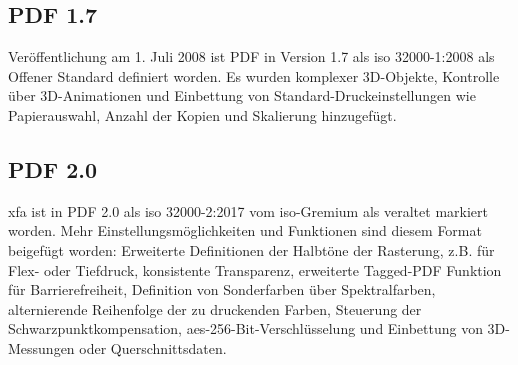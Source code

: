 \subsection{PDF 1.7}
Veröffentlichung am 1. Juli 2008 ist PDF in Version 1.7 als \gls{iso} 32000-1:2008 als Offener Standard definiert worden. Es wurden komplexer 3D-Objekte, Kontrolle über 3D-Animationen und Einbettung von Standard-Druckeinstellungen wie Papierauswahl, Anzahl der Kopien und Skalierung hinzugefügt.
\cite{proj-consult}

\subsection{PDF 2.0}
\gls{xfa} ist in PDF 2.0 als \gls{iso} 32000-2:2017 vom \gls{iso}-Gremium als veraltet markiert worden. Mehr Einstellungsmöglichkeiten und Funktionen sind diesem Format beigefügt worden: Erweiterte Definitionen der Halbtöne der Rasterung, z.B. für Flex- oder Tiefdruck, konsistente Transparenz, erweiterte Tagged-PDF Funktion für Barrierefreiheit, Definition von Sonderfarben über Spektralfarben, alternierende Reihenfolge der zu  druckenden Farben, Steuerung der Schwarzpunktkompensation, \gls{aes}-256-Bit-Verschlüsselung und Einbettung von 3D-Messungen oder Querschnittsdaten.
\cite{proj-consult}